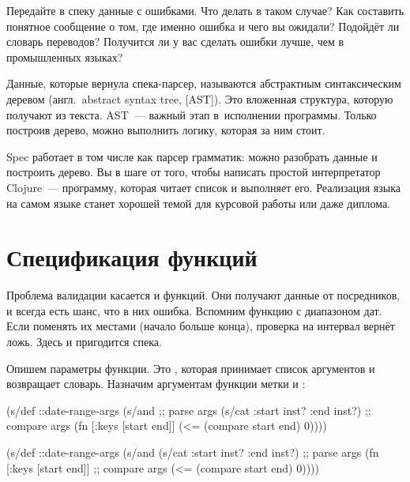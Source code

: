 Передайте в спеку данные с ошибками. Что делать в таком случае? Как составить
понятное сообщение о том, где именно ошибка и чего вы ожидали? Подойдёт ли
словарь переводов? Получится ли у вас сделать ошибки лучше, чем в промышленных
языках?

Данные, которые вернула спека-парсер, называются абстрактным синтаксическим деревом
(англ.~abstract syntax tree, [AST]).
Это вложенная структура, которую получают из текста. AST~--- важный этап в~исполнении
программы. Только построив дерево, можно выполнить логику, которая за ним стоит.


Spec работает в том числе как парсер грамматик: можно разобрать данные и
построить дерево. Вы в шаге от того, чтобы написать простой интерпретатор
Clojure~--- программу, которая читает список и выполняет его. Реализация языка
на самом языке станет хорошей темой для курсовой работы или даже диплома.

\section{Спецификация функций}


Проблема валидации касается и функций. Они получают данные от посредников, и
всегда есть шанс, что в них ошибка. Вспомним функцию с диапазоном дат. Если
поменять их местами (начало больше конца), проверка на интервал вернёт
ложь. Здесь и пригодится спека.

Опишем параметры функции. Это , которая принимает список аргументов
и возвращает словарь. Назначим аргументам функции метки  и
:

\pagebreakafive

\ifnarrow

\begin{clojure}
(s/def ::date-range-args
  (s/and
    ;; parse args
    (s/cat :start inst? :end inst?)
    ;; compare args
    (fn [{:keys [start end]}]
      (<= (compare start end) 0))))
\end{clojure}

\else

\begin{clojure}
(s/def ::date-range-args
  (s/and
   (s/cat :start inst? :end inst?) ;; parse args
   (fn [{:keys [start end]}]       ;; compare args
     (<= (compare start end) 0))))
\end{clojure}

